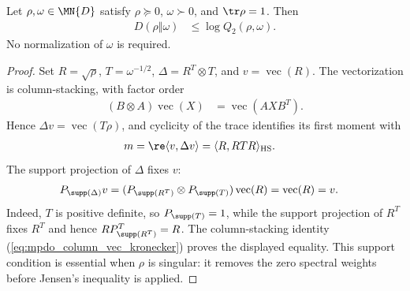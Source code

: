 \begin{theorem}
    \label{thm:relative_entropy_q2_posdef}
    \leanok
    Let $\rho,\omega\in\MN{D}$ satisfy $\rho\succeq0$, $\omega\succ0$, and
    $\tr\rho=1$. Then
    \begin{align}
        D(\rho\Vert\omega) & \leq\log Q_2(\rho,\omega).
        \label{eq:mpdo_relative_q2_posdef}
    \end{align}
    No normalization of $\omega$ is required.
\end{theorem}

\begin{proof}\leanok
    Set $R=\sqrt\rho$, $T=\omega^{-1/2}$,
    $\Delta=R^T\otimes T$, and $v=\operatorname{vec}(R)$. The vectorization
    is column-stacking, with factor order
    \begin{align}
        (B\otimes A)\operatorname{vec}(X)
         & =\operatorname{vec}(AXB^T).
        \label{eq:mpdo_column_vec_kronecker}
    \end{align}
    Hence $\Delta v=\operatorname{vec}(T\rho)$, and cyclicity of the trace
    identifies its first moment with
    \begin{align}
        m=\re\langle v,\Delta v\rangle
         & =\langle R,RTR\rangle_{\mathrm{HS}}.
        \label{eq:mpdo_relative_modular_half_moment}
    \end{align}
    The support projection of $\Delta$ fixes $v$:
    \begin{align}
        P_{\supp(\Delta)}v
         & =(P_{\supp(R^T)}\otimes P_{\supp(T)})\operatorname{vec}(R)
        =\operatorname{vec}(R)=v.
        \label{eq:mpdo_relative_modular_support_fixing}
    \end{align}
    Indeed, $T$ is positive definite, so $P_{\supp(T)}=1$, while the support
    projection of $R^T$ fixes $R^T$ and hence
    $R P_{\supp(R^T)}^T=R$. The column-stacking identity
    (\ref{eq:mpdo_column_vec_kronecker}) proves the displayed equality. This
    support condition is essential when $\rho$ is singular: it removes the
    zero spectral weights before Jensen's inequality is applied.


\end{proof}
